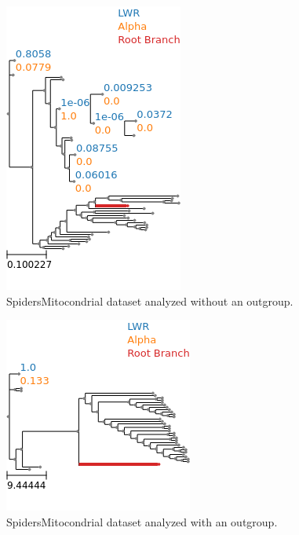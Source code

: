 \documentclass{article}
\begin{document}
\begin{figure}
  \begin{center}
    \includegraphics[width=.75\linewidth]{./figs/spiders/mito_no_outgroup.png}
    \caption{SpidersMitocondrial dataset analyzed without an outgroup.}
    \label{fig:spiders-mito-no-outgroup}
  \end{center}
\end{figure}

\begin{figure}
  \begin{center}
    \includegraphics[width=.75\linewidth]{./figs/spiders/mito_with_outgroup.png}
    \caption{SpidersMitocondrial dataset analyzed with an outgroup.}
    \label{fig:spiders-mito-outgroup}
  \end{center}
\end{figure}
\end{document}
